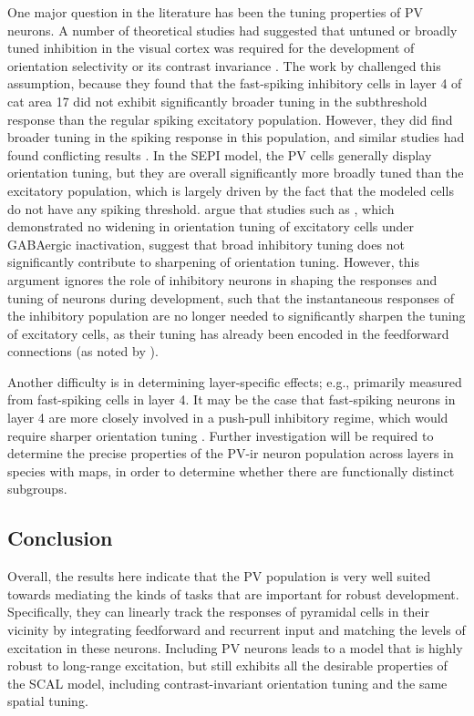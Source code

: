 One major question in the literature has been the tuning properties of
PV neurons. A number of theoretical studies had suggested that untuned
or broadly tuned inhibition in the visual cortex was required for the
development of orientation selectivity or its contrast invariance
\citep{Somers1995, Troyer1998}. The work by \cite{Cardin2007}
challenged this assumption, because they found that the fast-spiking
inhibitory cells in layer 4 of cat area 17 did not exhibit
significantly broader tuning in the subthreshold response than the
regular spiking excitatory population. However, they did find broader
tuning in the spiking response in this population, and similar studies
had found conflicting results \citep{Hirsch2003, Nowak2008}. In the
SEPI model, the PV cells generally display orientation tuning, but
they are overall significantly more broadly tuned than the excitatory
population, which is largely driven by the fact that the modeled cells
do not have any spiking threshold. \cite{Cardin2007} argue that
studies such as \cite{Nelson1994}, which demonstrated no widening in
orientation tuning of excitatory cells under GABAergic inactivation,
suggest that broad inhibitory tuning does not significantly contribute
to sharpening of orientation tuning. However, this argument ignores
the role of inhibitory neurons in shaping the responses and tuning of
neurons during development, such that the instantaneous responses of
the inhibitory population are no longer needed to significantly
sharpen the tuning of excitatory cells, as their tuning has already
been encoded in the feedforward connections (as noted by
\citealt{Miikkulainen2005}).

Another difficulty is in determining layer-specific effects; e.g.,
\cite{Cardin2007} primarily measured from fast-spiking cells in layer
4. It may be the case that fast-spiking neurons in layer 4 are more
closely involved in a push-pull inhibitory regime, which would require
sharper orientation tuning \citep{Hirsch2003, Hirsch2006a}. Further
investigation will be required to determine the precise properties of
the PV-ir neuron population across layers in species with maps, in
order to determine whether there are functionally distinct subgroups.

\subsection{Conclusion}

Overall, the results here indicate that the PV population is very well
suited towards mediating the kinds of tasks that are important for
robust development. Specifically, they can linearly track the
responses of pyramidal cells in their vicinity by integrating
feedforward and recurrent input and matching the levels of excitation
in these neurons. Including PV neurons leads to a model that is highly
robust to long-range excitation, but still exhibits all the desirable
properties of the SCAL model, including contrast-invariant orientation
tuning and the same spatial tuning.

